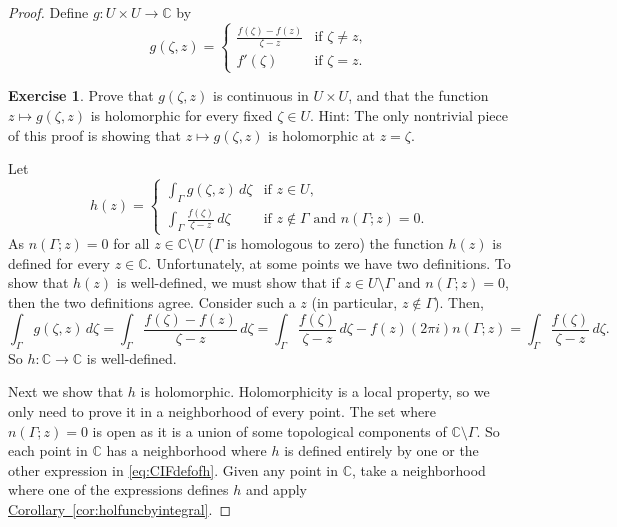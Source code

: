 \documentclass[12pt,openany]{book}
\newcommand{\C}{{\mathbb{C}}}
\theoremstyle{plain}
\theoremstyle{remark}
\theoremstyle{definition}
\newenvironment{exbox}{%
    \def\FrameCommand{\vrule width 1pt \relax\hspace{10pt}}%
    \MakeFramed{\advance\hsize-\width\FrameRestore}%
}{%
    \endMakeFramed
}
\theoremstyle{exercise}
\newtheorem{exercise}{Exercise}[section]
\theoremstyle{example}
\newcommand{\corref}[1]{\hyperref[#1]{Corollary~\ref*{#1}}}
\begin{document}
\begin{proof}
Define $g \colon U \times U \to \C$ by
\begin{equation*}
g(\zeta,z) =
\begin{cases}
\frac{f(\zeta)-f(z)}{\zeta-z} & \text{if } \zeta \not= z , \\
f'(\zeta)                 & \text{if } \zeta = z .
\end{cases}
\end{equation*}

\begin{exbox}
\begin{exercise}
Prove that $g(\zeta,z)$ is continuous in $U \times U$, and that
the function $z \mapsto g(\zeta,z)$ is holomorphic for every fixed $\zeta \in U$.
Hint: The only nontrivial piece of this proof is showing that $z \mapsto
g(\zeta,z)$ is
holomorphic at $z=\zeta$.
\end{exercise}
\end{exbox}

Let
\begin{equation}\label{eq:CIFdefofh}
h(z) = 
\begin{cases}
\int_\Gamma g(\zeta,z) \, d\zeta & \text{if } z \in U , \\
\int_\Gamma \frac{f(\zeta)}{\zeta-z} \, d\zeta & \text{if } z \not \in
\Gamma \text{ and } n(\Gamma;z) = 0 .
\end{cases}
\end{equation}
As $n(\Gamma;z) = 0$ for all $z \in \C \setminus U$
($\Gamma$ is homologous to zero)
the function $h(z)$ is defined for every $z \in \C$.
Unfortunately, at some points
we have two definitions.
To show that $h(z)$ is well-defined, we must show that if
$z \in U \setminus \Gamma$ and
$n(\Gamma;z) = 0$, then the two definitions agree.
Consider such a $z$ (in particular, $z \notin \Gamma$).  Then,
\begin{equation*}
\int_\Gamma g(\zeta,z) \, d\zeta
=
\int_\Gamma \frac{f(\zeta)-f(z)}{\zeta-z} \, d\zeta
=
\int_\Gamma \frac{f(\zeta)}{\zeta-z} \, d\zeta
-
f(z) (2\pi i) n(\Gamma;z)
=
\int_\Gamma \frac{f(\zeta)}{\zeta-z} \, d\zeta .
\end{equation*}
So $h \colon \C \to \C$ is well-defined.

Next we show that $h$ is
holomorphic.
Holomorphicity is a local property, so we only need to prove it 
in a neighborhood of every point.
The set where $n(\Gamma;z) = 0$ is open as it is a
union of some topological components of $\C \setminus \Gamma$.
So each point in $\C$ has a neighborhood where $h$ is defined
entirely by one or the other expression in \eqref{eq:CIFdefofh}.
Given any point in $\C$,
take a neighborhood where one of the expressions defines
$h$ and apply \corref{cor:holfuncbyintegral}.


\end{proof}
\end{document}
